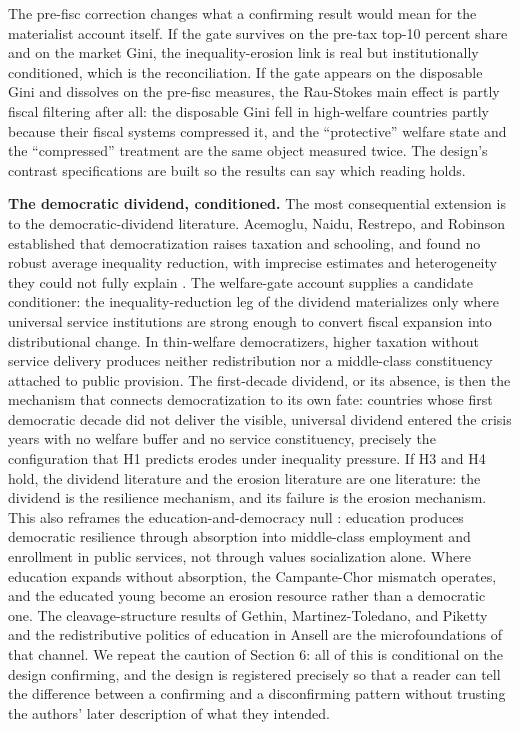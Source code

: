 \documentclass[11pt,letterpaper]{article}
\begin{document}
The pre-fisc correction changes what a confirming result would mean for the materialist account itself. If the gate survives on the pre-tax top-10 percent share and on the market Gini, the inequality-erosion link is real but institutionally conditioned, which is the reconciliation. If the gate appears on the disposable Gini and dissolves on the pre-fisc measures, the Rau-Stokes main effect is partly fiscal filtering after all: the disposable Gini fell in high-welfare countries partly because their fiscal systems compressed it, and the ``protective'' welfare state and the ``compressed'' treatment are the same object measured twice. The design's contrast specifications are built so the results can say which reading holds.

\textbf{The democratic dividend, conditioned.} The most consequential extension is to the democratic-dividend literature. Acemoglu, Naidu, Restrepo, and Robinson established that democratization raises taxation and schooling, and found no robust average inequality reduction, with imprecise estimates and heterogeneity they could not fully explain \citep{AcemogluNaidu2015}. The welfare-gate account supplies a candidate conditioner: the inequality-reduction leg of the dividend materializes only where universal service institutions are strong enough to convert fiscal expansion into distributional change. In thin-welfare democratizers, higher taxation without service delivery produces neither redistribution nor a middle-class constituency attached to public provision. The first-decade dividend, or its absence, is then the mechanism that connects democratization to its own fate: countries whose first democratic decade did not deliver the visible, universal dividend entered the crisis years with no welfare buffer and no service constituency, precisely the configuration that H1 predicts erodes under inequality pressure. If H3 and H4 hold, the dividend literature and the erosion literature are one literature: the dividend is the resilience mechanism, and its failure is the erosion mechanism. This also reframes the education-and-democracy null \citep{AcemogluJohnson2005}: education produces democratic resilience through absorption into middle-class employment and enrollment in public services, not through values socialization alone. Where education expands without absorption, the Campante-Chor mismatch \citep{CampanteChor2012} operates, and the educated young become an erosion resource rather than a democratic one. The cleavage-structure results of Gethin, Martinez-Toledano, and Piketty \citep{Gethin2022} and the redistributive politics of education in Ansell \citep{Ansell2010} are the microfoundations of that channel. We repeat the caution of Section 6: all of this is conditional on the design confirming, and the design is registered precisely so that a reader can tell the difference between a confirming and a disconfirming pattern without trusting the authors' later description of what they intended.
\end{document}
